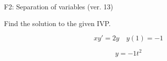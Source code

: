 \begin{exercise}
  \begin{exerciseTitle}F2: Separation of variables (ver. 13)\end{exerciseTitle}
  \begin{exerciseStatement}
    
Find the solution to the given IVP.

    
\[xy'= 2 y \hspace{1em} y( 1 ) = -1\]

  \end{exerciseStatement}
  \begin{exerciseAnswer}
    
\[y= -1 t^ 2\]

  \end{exerciseAnswer}
\end{exercise}